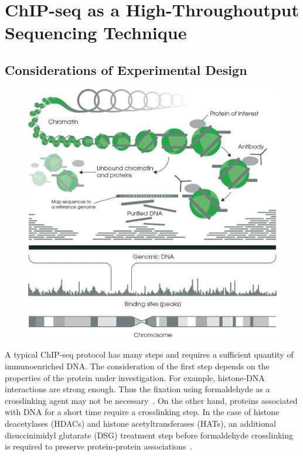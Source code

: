 \chapter{ChIP-seq as a High-Throughoutput Sequencing Technique}

\section{Considerations of Experimental Design}

\begin{figure}[b!]
    \centering
    \includegraphics[width=\textwidth]{../img/chip.jpeg}
    \label{fig:graph_classes}
\end{figure}

A typical ChIP-seq protocol has many steps and requires a sufficient quantity of immunoenriched DNA. 
The consideration of the first step depends on the properties of the protein under investigation. 
For example, histone-DNA interactions are strong enough. 
Thus the fixation using formaldehyde as a crosslinking agent may not be necessary~\cite{barski2008identification}. 
On the other hand, proteins associated with DNA for a short time require a crosslinking step. 
In the case of histone deacetylases (HDACs) and histone acetyltransferases (HATs), an additional disuccinimidyl glutarate (DSG) treatment step before formaldehyde crosslinking is required to preserve protein-protein associations~\cite{wang2009genome}. 



